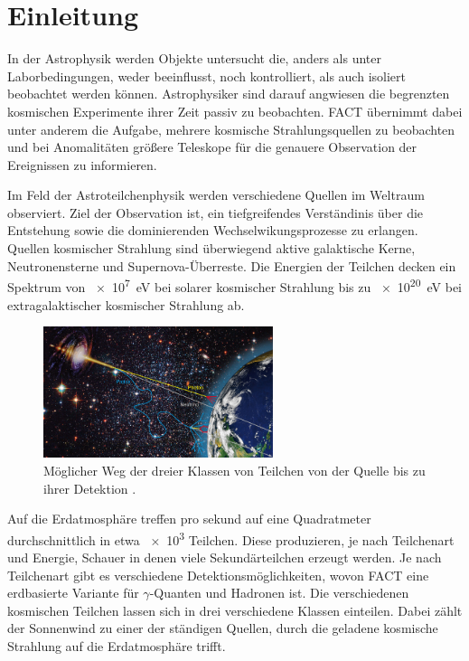 \chapter{Einleitung}
In der Astrophysik werden Objekte untersucht die, anders als unter Laborbedingungen, weder beeinflusst, noch kontrolliert, als auch isoliert beobachtet werden können.
Astrophysiker sind darauf angwiesen die begrenzten kosmischen Experimente ihrer Zeit passiv zu beobachten. 
FACT übernimmt dabei unter anderem die Aufgabe, mehrere kosmische Strahlungsquellen zu beobachten und bei Anomalitäten größere Teleskope für die genauere Observation der Ereignissen zu informieren. 

Im Feld der Astroteilchenphysik werden verschiedene Quellen im Weltraum observiert.
Ziel der Observation ist, ein tiefgreifendes Verständinis über die Entstehung sowie die dominierenden Wechselwikungsprozesse zu erlangen. 
Quellen kosmischer Strahlung sind überwiegend aktive galaktische Kerne, Neutronensterne und Supernova-Überreste. 
Die Energien der Teilchen decken ein Spektrum von \SI{e7}{\electronvolt} bei solarer kosmischer Strahlung bis zu \SI{e20}{\electronvolt} bei extragalaktischer kosmischer Strahlung ab. 

\begin{figure}
  \centering
  \includegraphics[width=0.6\textwidth]{./images/sources-detection.jpg}
  \caption{Möglicher Weg der dreier Klassen von Teilchen von der Quelle bis zu ihrer Detektion \cite{overview-detec}.}
\end{figure}

Auf die Erdatmosphäre treffen pro sekund auf eine Quadratmeter durchschnittlich in etwa \num{e3} Teilchen.
Diese produzieren, je nach Teilchenart und Energie, Schauer in denen viele Sekundärteilchen erzeugt werden. 
Je nach Teilchenart gibt es verschiedene Detektionsmöglichkeiten, wovon FACT eine erdbasierte Variante für $\gamma$-Quanten und Hadronen ist. 
Die verschiedenen kosmischen Teilchen lassen sich in drei verschiedene Klassen einteilen. 
Dabei zählt der Sonnenwind zu einer der ständigen Quellen, durch die geladene kosmische Strahlung auf die Erdatmosphäre trifft.

